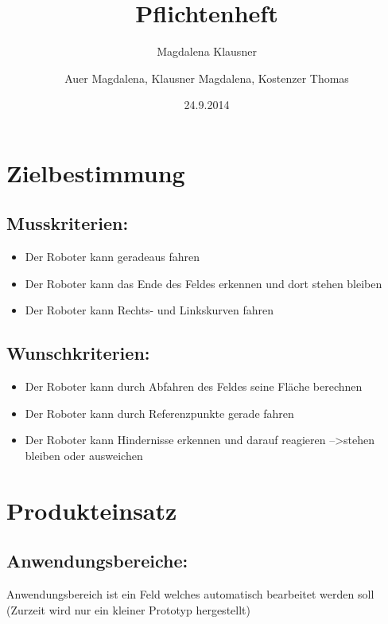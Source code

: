 \documentclass[12pt,a4paper]{article}
\author{Magdalena Klausner}
\newcommand{\changefont}[3]{
\fontfamily{#1}
\fontseries{#2}
\fontshape{#3}
\selectfont}
\begin{document}
\changefont{cmss}{m}{n}

\title{ Pflichtenheft}
\author{Auer Magdalena, Klausner Magdalena, Kostenzer Thomas }
\date{24.9.2014}
\maketitle


\newpage
\tableofcontents
\newpage


\section{ Zielbestimmung}
\subsection{ Musskriterien:}

\begin{itemize}
\item Der Roboter kann geradeaus fahren 
\item Der Roboter kann das Ende des Feldes erkennen und dort stehen bleiben
\item Der Roboter kann Rechts- und Linkskurven fahren
\end{itemize}


\subsection{Wunschkriterien:}
\begin{itemize}
\item Der Roboter kann durch Abfahren des Feldes seine Fläche berechnen 
\item Der Roboter kann durch Referenzpunkte gerade fahren
\item Der Roboter kann Hindernisse erkennen und darauf reagieren  --\textgreater stehen bleiben oder ausweichen
\end{itemize}


\section{ Produkteinsatz}

\subsection{Anwendungsbereiche:}

Anwendungsbereich ist ein Feld welches automatisch bearbeitet werden soll (Zurzeit wird nur ein kleiner Prototyp hergestellt)
\end{document}
